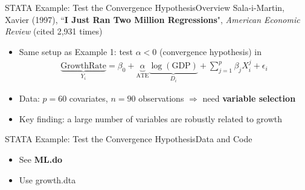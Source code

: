 \documentclass[hyperref={pdfpagelabels=false}]{beamer}
\begin{document}





\date
{}


\begin{frame}{}
	\titlepage
\end{frame}





\iffalse
\begin{frame}{STATA Example: Test the Convergence Hypothesis}{Overview}
	Sala-i-Martin, Xavier (1997), ``\textbf{I Just Ran Two Million Regressions}", \textit{American Economic Review} (cited 2,931 times)
	\vspace{0.3cm}
	\begin{itemize}
		\item Same setup as Example 1: test $\alpha < 0$ (convergence hypothesis) in
		\begin{eqnarray*}
			\underbrace{\mbox{GrowthRate}}_{Y_{i}} = \beta_{0} + \underbrace{\alpha}_{\mbox{ATE}} \underbrace{\log(\mbox{GDP})}_{D_{i}} + \sum^{p}_{j=1} \beta_{j} X^{j}_{i} + \epsilon_{i}
		\end{eqnarray*}
		\item Data: $p = 60$ covariates, $n = 90$ observations $\Rightarrow$ need \textbf{variable selection}
		\vspace{0.2cm}
		\item Key finding: a large number of variables are robustly related to growth
	\end{itemize}
\end{frame}



\begin{frame}[fragile]{STATA Example: Test the Convergence Hypothesis}{Data and Code}
	\begin{itemize}
	   \item See \textbf{ML.do}
		\vspace{0.2cm}
		\item Use growth.dta
		\vspace{0.2cm}
		
	\end{itemize}
\end{frame}
\end{document}
